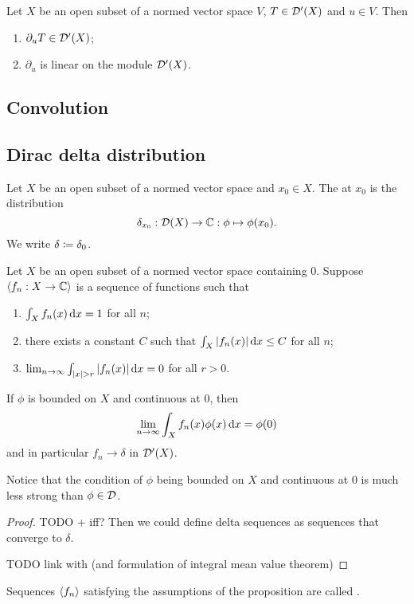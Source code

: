 \begin{proposition}
    Let $X$ be an open subset of a normed vector space $V$, $T\in \operatorname{\mathcal{D}^\prime}(X)$ and $u\in V$. Then
    \begin{enumerate}
    \item $\partial_{u}T \in \operatorname{\mathcal{D}^\prime}(X)$;
    \item $\partial_{u}$ is linear on the module $\operatorname{\mathcal{D}^\prime}(X)$.
    \end{enumerate}
\end{proposition}

\subsection{Convolution}

\subsection{Dirac delta distribution}
\begin{definition}
    Let $X$ be an open subset of a normed vector space and $x_0\in X$. The  at $x_0$ is the distribution
    \[ \delta_{x_0}: \operatorname{\mathcal{D}}(X) \to \mathbb{C}: \phi \mapsto \phi(x_0). \]
    We write $\delta \coloneqq \delta_0$.
\end{definition}

\begin{proposition}
Let $X$ be an open subset of a normed vector space containing $0$. Suppose $\left\langle f_n: X\to \mathbb{C} \right\rangle$ is a sequence of functions such that
\begin{enumerate}
\item $\int_X f_n(x)\operatorname{d \!}{x} = 1$ for all $n$;
\item there exists a constant $C$ such that $\int_X |f_n(x)|\operatorname{d \!}{x} \leq C$ for all $n$;
\item $\lim_{n\to \infty} \int_{|x|>r}|f_n(x)|\diff{x} = 0 $ for all $r > 0$.
\end{enumerate}
If $\phi$ is bounded on $X$ and continuous at $0$, then
\[ \lim_{n\to \infty} \int_X f_n(x)\phi(x)\operatorname{d \!}{x} = \phi(0) \]
and in particular $f_n\to \delta$ in $\operatorname{\mathcal{D}^\prime}(X)$.
\end{proposition}
Notice that the condition of $\phi$ being bounded on $X$ and continuous at $0$ is much less strong than $\phi\in\operatorname{\mathcal{D}}$.
\begin{proof}
TODO + iff? Then we could define delta sequences as sequences that converge to $\delta$.

TODO link with (and formulation of integral mean value theorem)
\end{proof}
Sequences $\left\langle f_n \right\rangle$ satisfying the assumptions of the proposition are called .

